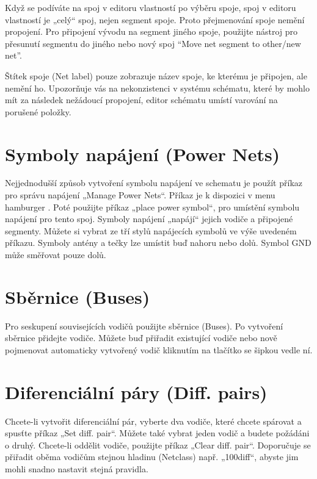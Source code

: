 \documentclass[letterpaper,10pt,czech]{sphinxmanual}
\let\sphinxpxdimen\pdfpxdimen\else\newdimen\sphinxpxdimen
\begin{document}
Když se podíváte na spoj v editoru vlastností po výběru spoje, spoj v editoru vlastností je „celý“ spoj, nejen segment spoje. Proto přejmenování spoje nemění propojení. Pro připojení vývodu na segment jiného spoje, použijte nástroj pro přesunutí segmentu do jiného nebo nový spoj “Move net segment to other/new net”.

Štítek spoje (Net label) pouze zobrazuje název spoje, ke kterému je připojen, ale nemění ho. Upozorňuje vás na nekonzistenci v systému schématu, které by mohlo mít za následek nežádoucí propojení, editor schématu umístí varování na porušené položky.


\section{Symboly napájení (Power Nets)}
\label{\detokenize{imp-sch:symboly-napajeni-power-nets}}
Nejjednodušší způsob vytvoření symbolu napájení ve schematu je použít příkaz pro správu napájení „Manage Power Nets“. Příkaz je k dispozici v menu hamburger \sphinxincludegraphics[height=10\sphinxpxdimen]{{hamburger}.png}. Poté použijte příkaz „place power symbol“, pro umístění symbolu napájení pro tento spoj. Symboly napájení „napájí“ jejich vodiče a připojené segmenty. Můžete si vybrat ze tří stylů napájecích symbolů ve výše uvedeném příkazu. Symboly antény a tečky
lze umístit buď nahoru nebo dolů. Symbol GND může směřovat pouze dolů.


\section{Sběrnice (Buses)}
\label{\detokenize{imp-sch:sbernice-buses}}
Pro seskupení souvisejících vodičů použijte sběrnice (Buses). Po vytvoření sběrnice přidejte vodiče. Můžete buď přiřadit existující vodiče nebo nově pojmenovat automaticky vytvořený vodič kliknutím na tlačítko se šipkou vedle ní.


\section{Diferenciální páry (Diff. pairs)}
\label{\detokenize{imp-sch:diferencialni-pary-diff-pairs}}\label{\detokenize{imp-sch:diferencialni-pary}}
Chcete-li vytvořit diferenciální pár, vyberte dva vodiče, které chcete spárovat a spusťte příkaz „Set diff. pair“. Můžete také vybrat jeden vodič a budete požádáni o druhý. Chcete-li oddělit vodiče, použijte příkaz „Clear diff. pair“. Doporučuje se přiřadit oběma vodičům stejnou hladinu (Netclass) např. „100diff“, abyste jim mohli snadno nastavit stejná pravidla.
\end{document}
